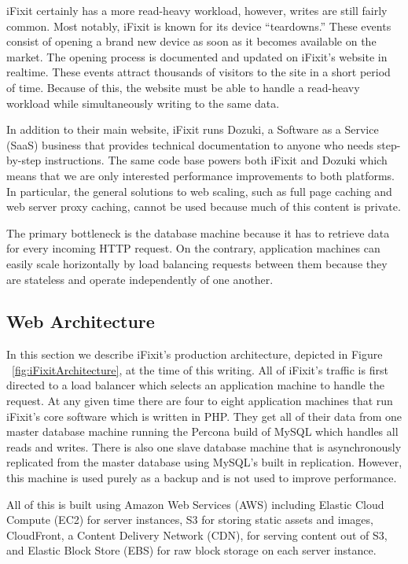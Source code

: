 \documentclass[12pt]{ucthesis}
\begin{document}
\textsf{iFixit} certainly has a more read-heavy workload, however, writes are still fairly common.
Most notably, \textsf{iFixit} is known for its device ``teardowns.''
These events consist of opening a brand new device as soon as it becomes available on the market.
The opening process is documented and updated on \textsf{iFixit}'s website in realtime.
These events attract thousands of visitors to the site in a short period of time.
Because of this, the website must be able to handle a read-heavy workload while simultaneously writing to the same data.

In addition to their main website, \textsf{iFixit} runs \textsf{Dozuki}, a Software as a Service (SaaS) business that provides technical documentation to anyone who needs step-by-step instructions.
The same code base powers both \textsf{iFixit} and \textsf{Dozuki} which means that we are only interested performance improvements to both platforms.
In particular, the general solutions to web scaling, such as full page caching and web server proxy caching, cannot be used because much of this content is private.

The primary bottleneck is the database machine because it has to retrieve data for every incoming HTTP request.
On the contrary, application machines can easily scale horizontally by load balancing requests between them because they are stateless and operate independently of one another.

\subsection{Web Architecture}
In this section we describe \textsf{iFixit}'s production architecture, depicted in Figure ~\ref{fig:iFixitArchitecture}, at the time of this writing.
All of \textsf{iFixit}'s traffic is first directed to a load balancer which selects an application machine to handle the request.
At any given time there are four to eight application machines that run \textsf{iFixit}'s core software which is written in PHP.
They get all of their data from one master database machine running the Percona build of \textsf{MySQL} which handles all reads and writes.
There is also one slave database machine that is asynchronously replicated from the master database using \textsf{MySQL}'s built in replication.
However, this machine is used purely as a backup and is not used to improve performance.

All of this is built using Amazon Web Services (AWS) including Elastic Cloud Compute (EC2) for server instances, S3 for storing static assets and images, CloudFront, a Content Delivery Network (CDN), for serving content out of S3, and Elastic Block Store (EBS) for raw block storage on each server instance.
\end{document}
